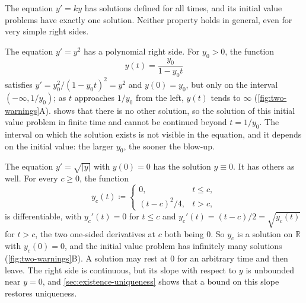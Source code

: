 The equation $y'=ky$ has solutions defined for all times, and its initial value problems have exactly one solution. Neither property holds in general, even for very simple right sides.

The equation $y'=y^2$ has a polynomial right side. For $y_0>0$, the function
\[
y(t)=\frac{y_0}{1-y_0t}
\]
satisfies $y'=y_0^2/(1-y_0t)^2=y^2$ and $y(0)=y_0$, but only on the interval $(-\infty,1/y_0)$; as $t$ approaches $1/y_0$ from the left, $y(t)$ tends to $\infty$ (\cref{fig:two-warnings}A).  shows that there is no other solution, so the solution of this initial value problem  in finite time and cannot be continued beyond $t=1/y_0$. The interval on which the solution exists is not visible in the equation, and it depends on the initial value: the larger $y_0$, the sooner the blow-up.

The equation $y'=\sqrt{|y|}$ with $y(0)=0$ has the solution $y\equiv0$. It has others as well. For every $c\ge0$, the function
\[
y_c(t)\coloneqq\begin{cases}0,&t\le c,\\(t-c)^2/4,&t>c,\end{cases}
\]
is differentiable, with $y_c'(t)=0$ for $t\le c$ and $y_c'(t)=(t-c)/2=\sqrt{y_c(t)}$ for $t>c$, the two one-sided derivatives at $c$ both being $0$. So $y_c$ is a solution on $\mathbb R$ with $y_c(0)=0$, and the initial value problem has infinitely many solutions (\cref{fig:two-warnings}B). A solution may rest at $0$ for an arbitrary time and then leave. The right side is continuous, but its slope with respect to $y$ is unbounded near $y=0$, and \cref{sec:existence-uniqueness} shows that a bound on this slope restores uniqueness.

